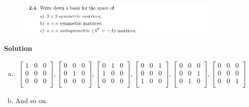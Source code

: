 \documentclass[cs4size,a4paper]{ctexart}
\numberwithin{equation}{section}
\numberwithin{table}{section}
\numberwithin{figure}{section}
\begin{document}
	\subsubsection{}
	\begin{figure}[H]
		\centering
		\includegraphics[width=0.9\textwidth]{1-2-4.png}
	\end{figure}
	\textbf{Solution}
	\begin{enumerate}[a)]
		\item	
		\begin{align}
			\left[\begin{matrix}
				1& 0&0\\
				0& 0&0\\
				0& 0&0\\
			\end{matrix}\right]
			,
			\left[\begin{matrix}
				0& 0&0\\
				0& 1&0\\
				0& 0&0\\
			\end{matrix}\right]
			,
			\left[\begin{matrix}
				0& 1&0\\
				1& 0&0\\
				0& 0&0\\
			\end{matrix}\right]
			,
			\left[\begin{matrix}
				0& 0&1\\
				0& 0&0\\
				1& 0&0\\
			\end{matrix}\right]
			,			
			\left[\begin{matrix}
				0& 0&0\\
				0& 0&1\\
				0& 1&0\\
			\end{matrix}\right]
			,
			\left[\begin{matrix}
				0& 0&0\\
				0& 0&0\\
				0& 0&1\\
		\end{matrix}\right]
		\end{align}
		\item And so on.

\end{enumerate}
\end{document}

